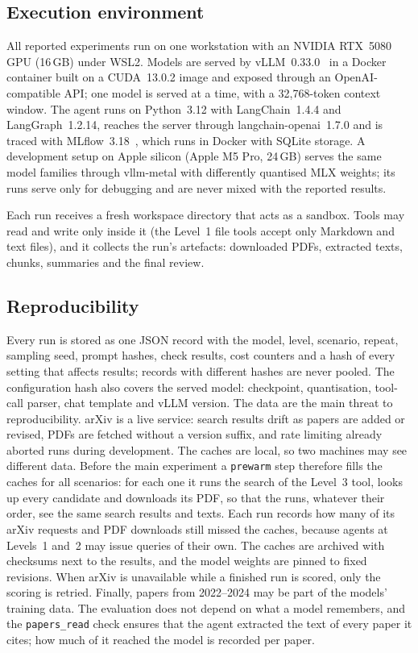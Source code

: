 \subsection{Execution environment}
\label{sec:environment}

All reported experiments run on one workstation with an NVIDIA RTX~5080 GPU (16\,GB) under WSL2. Models are served by vLLM~0.33.0~\citep{kwon2023vllm} in a Docker container built on a CUDA~13.0.2 image and exposed through an OpenAI-compatible API; one model is served at a time, with a 32{,}768-token context window. The agent runs on Python~3.12 with LangChain~1.4.4 and LangGraph~1.2.14, reaches the server through langchain-openai~1.7.0 and is traced with MLflow~3.18~\citep{zaharia2018mlflow}, which runs in Docker with SQLite storage. A development setup on Apple silicon (Apple M5 Pro, 24\,GB) serves the same model families through vllm-metal with differently quantised MLX weights; its runs serve only for debugging and are never mixed with the reported results.

Each run receives a fresh workspace directory that acts as a sandbox. Tools may read and write only inside it (the Level~1 file tools accept only Markdown and text files), and it collects the run's artefacts: downloaded PDFs, extracted texts, chunks, summaries and the final review.

\subsection{Reproducibility}
\label{sec:repro}

Every run is stored as one JSON record with the model, level, scenario, repeat, sampling seed, prompt hashes, check results, cost counters and a hash of every setting that affects results; records with different hashes are never pooled. The configuration hash also covers the served model: checkpoint, quantisation, tool-call parser, chat template and vLLM version. The data are the main threat to reproducibility. arXiv is a live service: search results drift as papers are added or revised, PDFs are fetched without a version suffix, and rate limiting already aborted runs during development. The caches are local, so two machines may see different data. Before the main experiment a \texttt{prewarm} step therefore fills the caches for all scenarios: for each one it runs the search of the Level~3 tool, looks up every candidate and downloads its PDF, so that the runs, whatever their order, see the same search results and texts. Each run records how many of its arXiv requests and PDF downloads still missed the caches, because agents at Levels~1 and~2 may issue queries of their own. The caches are archived with checksums next to the results, and the model weights are pinned to fixed revisions. When arXiv is unavailable while a finished run is scored, only the scoring is retried. Finally, papers from 2022--2024 may be part of the models' training data. The evaluation does not depend on what a model remembers, and the \texttt{papers\_read} check ensures that the agent extracted the text of every paper it cites; how much of it reached the model is recorded per paper.

